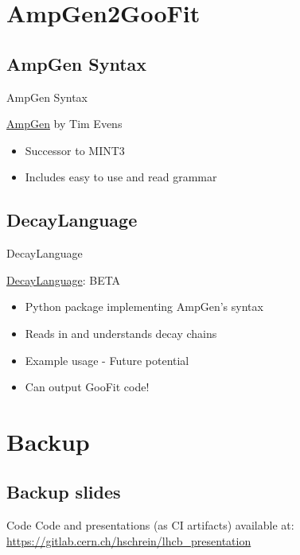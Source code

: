 \documentclass[aspectratio=169, smaller]{beamer}
\begin{document}
\section{AmpGen2GooFit}
\subsection{AmpGen Syntax}
\begin{frame}{AmpGen Syntax}
    \begin{block}{\href{https://gitlab.cern.ch/lhcb/Gauss/tree/LHCBGAUSS-1058.AmpGenDev/Gen/AmpGen}{AmpGen} by Tim Evens}
    \begin{itemize}
        \item Successor to MINT3
        \item Includes easy to use and read grammar
    \end{itemize}
\end{block}
\end{frame}

\subsection{DecayLanguage}
\begin{frame}{DecayLanguage}

    \begin{block}{\href{https://decaylanguage.readthedocs.io/en/latest/}{DecayLanguage}: BETA}
        \begin{itemize}
            \item Python package implementing AmpGen's syntax
            \item Reads in and understands decay chains
            \item Example usage - Future potential
            \item Can output GooFit code!
        \end{itemize}
    \end{block}
\end{frame}



\backupbegin
\section{Backup}

\subsection{Backup slides}

\begin{frame}{Code}
	Code and presentations (as CI artifacts) available at: \url{https://gitlab.cern.ch/hschrein/lhcb_presentation}
\end{frame}

\backupend
\end{document}
